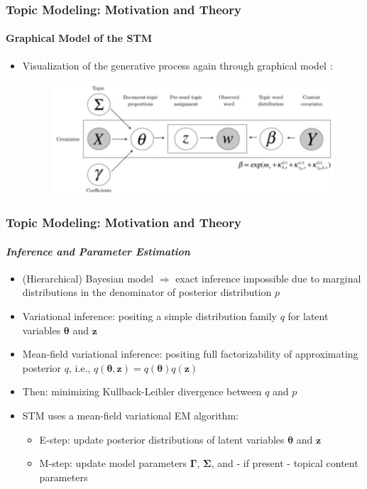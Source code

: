 \documentclass[xcolor=dvipsnames]{beamer}
\begin{document}
\begin{frame}
\frametitle{Topic Modeling: Motivation and Theory}
\framesubtitle{Graphical Model of the STM}
\begin{itemize}
\item Visualization of the generative process again through graphical model \parencite{roberts2016model}:
\begin{figure}[h!]
\centering
\hspace*{-1cm}\includegraphics[scale = 0.4]{../plots/presentation/stm_graphical.png}
\end{figure}
\end{itemize}
\end{frame}

\begin{frame}
\frametitle{Topic Modeling: Motivation and Theory}
\framesubtitle{\textit{Inference and Parameter Estimation}}
\begin{itemize}
\vspace{-0.5cm}
\item (Hierarchical) Bayesian model $\Rightarrow$ exact inference impossible due to marginal distributions in the denominator of posterior distribution $p$
\item Variational inference: positing a simple distribution family $q$ for latent variables $\boldsymbol{\theta}$ and $\boldsymbol{z}$
\item Mean-field variational inference: positing full factorizability of approximating posterior $q$, i.e., $q(\boldsymbol{\theta}, \boldsymbol{z})=q(\boldsymbol{\theta})q(\boldsymbol{z})$
\item Then: minimizing Kullback-Leibler divergence between $q$ and $p$
\item STM uses a mean-field variational EM algorithm:
\begin{itemize}
\item E-step: update posterior distributions of latent variables $\boldsymbol{\theta}$ and $\boldsymbol{z}$
\item M-step: update model parameters $\boldsymbol{\Gamma}$, $\boldsymbol{\Sigma}$, and - if present - topical content parameters
\end{itemize}
\end{itemize}
\end{frame}
\end{document}
